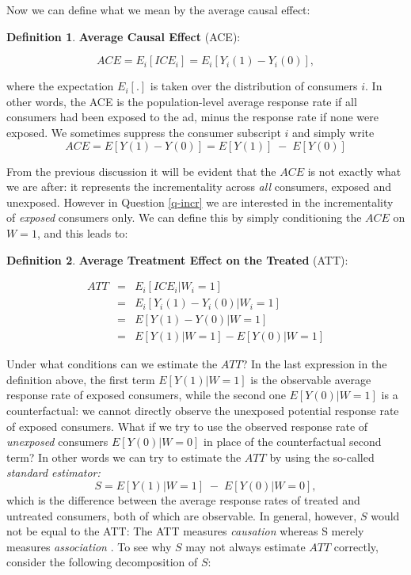 \documentclass[11pt,a4paper]{article}
\theoremstyle{definition}
\newtheorem{definition}{Definition}[section]
\theoremstyle{remark}
\theoremstyle{definition}
\theoremstyle{definition}
\theoremstyle{definition}
\theoremstyle{definition}
\theoremstyle{definition}
\theoremstyle{definition}
\begin{document}
Now we can define what we mean by the average causal effect:

\begin{definition}\label{ace}\small
{\bf Average Causal Effect} (ACE):

$$
ACE = E_i[ ICE_i] = E_i [Y_i(1) - Y_i(0) ],
$$
\end{definition}
where the expectation $E_i[.]$ is taken over the distribution of consumers $i$. In other words, the ACE is the population-level average response rate if all consumers had been exposed to the ad, minus the response rate if none were exposed. We sometimes suppress the consumer subscript $i$ and simply write 
$$
ACE = E[ Y(1) - Y(0) ] = E [Y(1)] \; - \; E [Y(0)]
$$

From the previous discussion it will be evident that the $ACE$ is not exactly what we are after: it represents the incrementality across {\em all} consumers, exposed and unexposed. However in Question \ref{q-incr} we are interested in the incrementality of {\em exposed} consumers only. We can define this by simply conditioning the $ACE$ on $W=1$, and this leads to:

\begin{definition}\label{att}\small
{\bf Average Treatment Effect on the Treated} (ATT):

\begin{eqnarray}
ATT & = & E_i[ ICE_i | W_i = 1] \\
    & = & E_i [Y_i(1) - Y_i(0) | W_i = 1] 	\\
	& = & E[ Y(1) - Y(0) | W=1] \\
	& = & E[ Y(1) | W=1] - E[ Y(0) | W=1]
\end{eqnarray}

\end{definition}



Under what conditions can we estimate the $ATT$? In the last expression in the definition above, the first term $E[ Y(1) | W=1]$ is the observable average response rate of exposed consumers, while the second one $E[ Y(0) | W=1]$ is a counterfactual: we cannot directly observe the unexposed potential response rate of exposed consumers. What if we try to use the observed response rate of {\em unexposed} consumers $E[Y(0) | W=0]$ in place of the counterfactual second term? In other words we can try to estimate the $ATT$ by using the so-called {\em standard estimator:} 
$$
S = E[ Y(1) | W = 1]  \; -  \; E[ Y(0) | W = 0 ],
$$
which is the difference between the average response rates of treated and untreated consumers, both of which are observable. In general, however, $S$ would not be equal to the ATT: The ATT measures {\em causation} whereas S merely measures {\em association} \cite{elwert2013graphical}. To see why $S$ may not always estimate $ATT$ correctly, consider the following decomposition of $S$:
\end{document}
